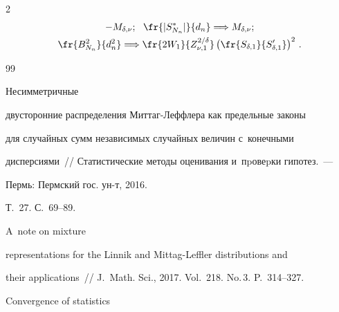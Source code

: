 \begin{multicols}{2}
\begin{gather*}
-M_{\delta,\nu};\ \ 


 \fr{|S^*_{N_n}|}{d_n}\Longrightarrow


M_{\delta,\nu};\\ 


\fr{B^2_{N_n}}{d^2_n}\Longrightarrow


\fr{2W_1}{Z_{\nu,1}^{2/\delta}}\left(\fr{S_{\delta,1}}{S'_{\delta,1}}\right)^2\,.


\end{gather*}





\vspace*{-12pt}








{\small\frenchspacing


 {%




 \begin{thebibliography}{99}




 Несимметричные


дву\-сто\-ронние распределения Миттаг-Леффлера как предельные законы


для случайных сумм независимых случайных величин с~конечными


дисперсиями~// Статистические методы оценивания и~пpовеpки гипотез.~---


Пермь: Пермский гос. ун-т, 2016. 


Т.~27. С.~69--89.









 A~note on mixture


representations for the Linnik and Mittag-Leffler distributions and


their applications~// J.~Math. Sci., 2017. Vol.~218. No.\,3. P.~314--327.







 Convergence of statistics



\end{thebibliography}}}
\end{multicols}
